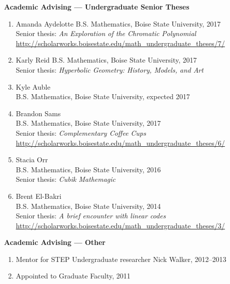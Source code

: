 \documentclass[12pt]{article}
\begin{document}
\textbf{Academic Advising --- Undergraduate Senior Theses}
\begin{enumerate}
\item Amanda Aydelotte
B.S. Mathematics, Boise State University, 2017 \\
Senior thesis: \emph{An Exploration of the Chromatic Polynomial} \\
\url{http://scholarworks.boisestate.edu/math_undergraduate_theses/7/}

\item Karly Reid
B.S. Mathematics, Boise State University, 2017 \\
Senior thesis: \emph{Hyperbolic Geometry: History, Models, and Art}

\item Kyle Auble \\
B.S. Mathematics, Boise State University, expected 2017

\item Brandon Sams \\
B.S. Mathematics, Boise State University, 2017 \\
Senior thesis: \emph{Complementary Coffee Cups} \\
\url{http://scholarworks.boisestate.edu/math_undergraduate_theses/6/}

\item Stacia Orr \\
B.S. Mathematics, Boise State University, 2016 \\
Senior thesis: \emph{Cubik Mathemagic}

\item Brent El-Bakri \\
B.S. Mathematics, Boise State University, 2014 \\
Senior thesis: \emph{A brief encounter with linear codes} \\
\url{http://scholarworks.boisestate.edu/math_undergraduate_theses/3/}
\end{enumerate}



\textbf{Academic Advising --- Other}
\begin{enumerate}
\item Mentor for STEP Undergraduate researcher Nick Walker, 2012--2013

\item Appointed to Graduate Faculty, 2011
\end{enumerate}
\end{document}
